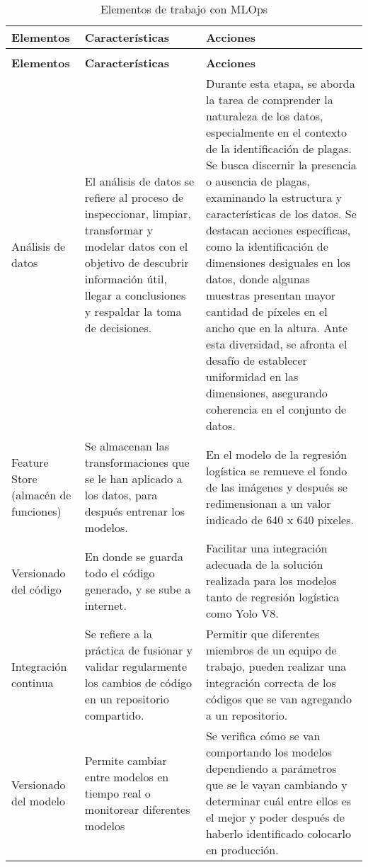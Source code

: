 \begin{longtable}{|p{3cm}|p{5cm}|p{6cm}|}
\caption{Elementos de trabajo con MLOps}\\
    \textbf{Elementos} & \textbf{Características} & \textbf{Acciones} \\
    \hline
    \endfirsthead
    \caption[]{Elementos de trabajo con MLOps}\\
    \textbf{Elementos} & \textbf{Características} & \textbf{Acciones} \\
    \hline
    \endhead
    
    \hline
    \endfoot
    
    \hline
    \endlastfoot
        Análisis de datos & El análisis de datos se refiere al proceso de inspeccionar, limpiar, transformar y modelar datos con el objetivo de descubrir información útil, llegar a conclusiones y respaldar la toma de decisiones. & Durante esta etapa, se aborda la tarea de comprender la naturaleza de los datos, especialmente en el contexto de la identificación de plagas. Se busca discernir la presencia o ausencia de plagas, examinando la estructura y características de los datos. Se destacan acciones específicas, como la identificación de dimensiones desiguales en los datos, donde algunas muestras presentan mayor cantidad de píxeles en el ancho que en la altura. Ante esta diversidad, se afronta el desafío de establecer uniformidad en las dimensiones, asegurando coherencia en el conjunto de datos. \\
        \hline
        Feature Store (almacén de funciones) & Se almacenan las transformaciones que se le han aplicado a los datos, para después entrenar los modelos. & En el modelo de la regresión logística se remueve el fondo de las imágenes y después se redimensionan a un valor indicado de 640 x 640 pixeles. \\
        \hline
        Versionado del código & En donde se guarda todo el código generado, y se sube a internet. & Facilitar una integración adecuada de la solución realizada para los modelos tanto de regresión logística como Yolo V8. \\
        \hline
        Integración continua & Se refiere a la práctica de fusionar y validar regularmente los cambios de código en un repositorio compartido. & Permitir que diferentes miembros de un equipo de trabajo, pueden realizar una integración correcta de los códigos que se van agregando a un repositorio. \\
        \hline
        Versionado del modelo & Permite cambiar entre modelos en tiempo real o monitorear diferentes modelos & Se verifica cómo se van comportando los modelos dependiendo a parámetros que se le vayan cambiando y determinar cuál entre ellos es el mejor y poder después de haberlo identificado colocarlo en producción.  \\

\end{longtable}
